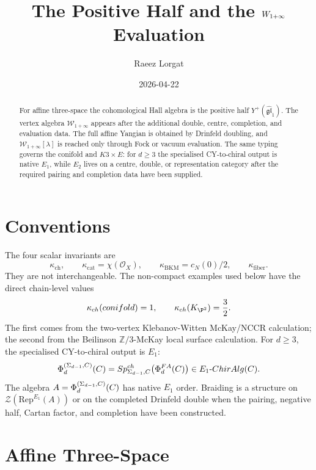 \documentclass[11pt]{article}
\title{The Positive Half and the $\Winf$ Evaluation}
\author{Raeez Lorgat}
\date{2026-04-22}
\theoremstyle{definition}
\theoremstyle{remark}
\providecommand{\Winf}{\mathcal{W}_{1+\infty}}
\providecommand{\Rep}{\mathrm{Rep}}
\providecommand{\gghone}{\widehat{\mathfrak{gl}}_1}
\providecommand{\cO}{\mathcal{O}}
\providecommand{\cZ}{\mathcal{Z}}
\providecommand{\Eone}{E_1}
\providecommand{\Etwo}{E_2}
\providecommand{\kch}{\kappa_{\mathrm{ch}}}
\providecommand{\kcat}{\kappa_{\mathrm{cat}}}
\providecommand{\kBKM}{\kappa_{\mathrm{BKM}}}
\providecommand{\kfib}{\kappa_{\mathrm{fiber}}}
\providecommand{\PhiFA}{\Phi^{\mathrm{FA}}}
\providecommand{\SpCh}{\mathrm{Sp}^{\mathrm{ch}}}
\begin{document}
\maketitle

\begin{abstract}
For affine three-space the cohomological Hall algebra is the positive
half $Y^+(\gghone)$. The vertex algebra $\Winf$ appears after the
additional double, centre, completion, and evaluation data. The full
affine Yangian is obtained by Drinfeld doubling, and $\Winf[\lambda]$ is
reached only through Fock or vacuum evaluation. The same typing governs
the conifold and $K3\times E$: for $d\ge 3$ the specialised
CY-to-chiral output is native $\Eone$, while $\Etwo$ lives on a centre,
double, or representation category after the required pairing and
completion data have been supplied.
\end{abstract}

\section{Conventions}
\label{sec:conventions}

The four scalar invariants are
\[
 \kch,\qquad \kcat=\chi(\cO_X),\qquad
 \kBKM=c_N(0)/2,\qquad \kfib.
\]
They are not interchangeable. The non-compact examples used below have
the direct chain-level values
\[
 \kch(\mathrm{conifold})=1,\qquad
 \kch(K_{\P^2})=\frac32.
\]
The first comes from the two-vertex Klebanov-Witten McKay/NCCR
calculation; the second from the Beilinson $\mathbb Z/3$-McKay local
surface calculation. For $d\ge 3$, the specialised CY-to-chiral output
is $\Eone$:
\[
 \Phi_d^{(\Sigma_{d-1},C)}(\cC)
 =\SpCh_{\Sigma_{d-1},C}\bigl(\PhiFA_d(\cC)\bigr)
 \in \Eone\text{-}\mathrm{ChirAlg}(C).
\]
The algebra $A=\Phi_d^{(\Sigma_{d-1},C)}(C)$ has native $\Eone$
order.  Braiding is a structure on $\cZ(\Rep^{\Eone}(A))$ or on the
completed Drinfeld double when the pairing, negative half, Cartan
factor, and completion have been constructed.

\section{Affine Three-Space}
\label{sec:c3}
\end{document}
